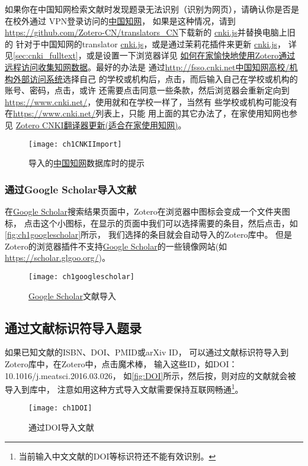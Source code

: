 \documentclass[theorem=false,mathfont=none,openany,sub3section]{easybook}
\begin{document}
如果你在中国知网检索文献时发现题录无法识别（识别为网页），请确认你是否是在校外通过
VPN登录访问的\href{www.cnki.net}{中国知网}， 如果是这种情况，请到
\url{https://github.com/Zotero-CN/translators_CN}下载新的
\href{https://github.com/Zotero-CN/translators_CN}{cnki.js}并替换电脑上旧的
针对于中国知网的translator \href{https://github.com/Zotero-CN/translators_CN}
{cnki.js}，或是通过茉莉花插件来更新
\href{https://github.com/Zotero-CN/translators_CN}{cnki.js}，
详见\cref{sec:cnki_fulltext}，或是设置一下浏览器详见
\href{https://zhuanlan.zhihu.com/p/110731827}{如何在家愉快地使用Zotero通过远程访问收集知网数据}。最好的办法是
通过\href{ http://fsso.cnki.net}{http://fsso.cnki.net中国知网高校/机构外部访问系统}选择自己
的学校或机构后，点击，而后输入自己在学校或机构的账号、密码，点击，或许
还需要点击同意一些条款，然后浏览器会重新定向到
\href{www.cnki.net}{https://www.cnki.net/}，使用就和在学校一样了，当然有
些学校或机构可能没有在\href{www.cnki.net}{https://www.cnki.net/}列表上，只能
用上面的其它办法了，在家使用知网也参见
\href{https://zhuanlan.zhihu.com/p/351547307}{Zotero CNKI翻译器更新(适合在家使用知网)}。
\begin{figure}[htbp]
	\centering
	\texttt{[image: ch1CNKIImport]}
	\caption{导入的\href{www.cnki.net}{中国知网}数据库时的提示}
	\label{fig:ch1CNKIImport}
\end{figure}
\subsubsection{通过Google Scholar导入文献}
在\href{https://scholar.google.cz/schhp?hl=zh-CN}{Google Scholar}搜索结果页面中，Zotero在浏览器中图标会变成一个文件夹图标，
点击这个小图标，在显示的页面中我们可以选择需要的条目，然后点击，如\autoref{fig:ch1googlescholar}所示，
我们选择的条目就会自动导入的Zotero库中。
但是Zotero的浏览器插件不支持\href{https://scholar.google.cz/schhp?hl=zh-CN}{Google Scholar}的一些镜像网站(如\url{https://scholar.glgoo.org/})。
\begin{figure}[htbp]
	\centering
	\texttt{[image: ch1googlescholar]}
	\caption{\href{https://scholar.google.com}{Google Scholar}文献导入}
	\label{fig:ch1googlescholar}
\end{figure}

\subsection{通过文献标识符导入题录}
如果已知文献的ISBN、DOI、PMID或arXiv ID，
可以通过文献标识符导入到Zotero库中，在Zotero中，点击魔术棒，
输入这些ID，如DOI：10.1016/j.meatsci.2016.03.026，
如\autoref{fig:DOI}所示，然后按，则对应的文献就会被导入到库中，
注意如用这种方式导入文献需要保持互联网畅通\footnote{当前输入中文文献的DOI等标识符还不能有效识别。}。
\begin{figure}[htbp]
	\centering
	\texttt{[image: ch1DOI]}
	\caption{通过DOI导入文献}
	\label{fig:DOI}
\end{figure}
\end{document}
